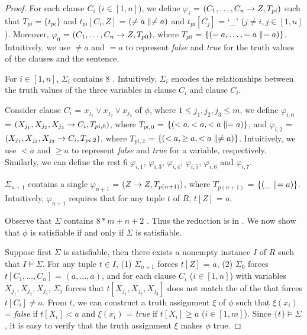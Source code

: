 {\begin{proof}
For each clause $C_i$ ($i\in[1, n]$), we define \pCFD $\varphi_i$ =
$(C_1,\ldots, C_n\rightarrow Z, T_{pi})$ such that $T_{pi} = \{t_{pi}\}$ and
$t_{pi}[C_i,Z]$ = $(\ne a \parallel \ne a)$ and $t_{pi}[C_j]$ = `\_'
($j\ne i, j\in[1, n]$). Moreover, \pCFD $\varphi_{0}$ =
$(C_1,\ldots, C_n\rightarrow Z, T_{p0})$, where $T_{p0}$ = $\{(= a, \ldots,
=a \parallel = a)\}$. Intuitively, we use $\ne a$ and $= a$ to represent
{\em false} and {\em true} for the truth values of the clauses and
the sentence.

\item For $i\in[1, n]$, $\Sigma_i$ contains $8$ \pCFDs.  Intuitively, $\Sigma_i$
encodes the relationships between the truth values of the three
variables in clause $C_i$ and clause $C_i$.

Consider clause $C_i$ = $x_{j_1} \lor \overline{x_{j_2}} \lor
x_{j_3}$ of $\phi$, where $1\le j_1, j_2, j_3 \le m$, we define
\pCFDs $\varphi_{i,0}$ = $(X_{j_1},X_{j_2},X_{j_3}\rightarrow C_i,
T_{pi,0})$, where $T_{pi,0}$ = $\{(< a, < a, <a \parallel = a)\}$, and
$\varphi_{i,2}$ = $(X_{j_1},X_{j_2},X_{j_3}\rightarrow C_i, T_{pi,2})$,
where $T_{pi,2}$ = $\{(< a, \ge a, < a \parallel \ne a)\}$. Intuitively,
we use $<a$ and $\ge a$ to represent {\em false} and {\em true} for
a variable, respectively. Similarly, we can define the rest $6$
\pCFDs $\varphi_{i,1}$, $\varphi_{i,3}$, $\varphi_{i,4}$,
$\varphi_{i,5}$, $\varphi_{i,6}$ and $\varphi_{i,7}$.

\item $\Sigma_{n + 1}$ contains a single \pCFD $\varphi_{n+1}$ =
$(Z \rightarrow Z, T_{p(n+1)})$, where $T_{p(n+1)}$ = $\{(\_ \parallel = a)\}$.
Intuitively, $\varphi_{n+1}$ requires that for any tuple $t$ of $R$,
$t[Z]$ = $a$. \ei\vspace{-1.5ex}

Observe that $\Sigma$ contains $8*m + n + 2$ \pCFDs. Thus the
reduction is in \PTIME. We now show that $\phi$ is satisfiable if
and only if $\Sigma$ is satisfiable.

Suppose first $\Sigma$ is satisfiable, then there exists a nonempty
instance $I$ of $R$ such that $I\models\Sigma$. For any tuple $t\in
I$, (1) $\Sigma_{n+1}$ forces $t[Z]$ = $a$, (2) $\Sigma_0$ forces
$t[C_1, \ldots, C_n]$ = $(a, \ldots, a)$, and for each clause $C_i$
($i\in[1, n]$) with variables $X_{j_1},X_{j_2},X_{j_3}$, $\Sigma_j$
forces that $t[X_{j_1},X_{j_2},X_{j_3}]$  does not match the \LHS of
the \pCFD that forces $t[C_i]\ne a$. From $t$, we can construct a
truth assignment $\xi$ of $\phi$ such that $\xi(x_i)$ = {\em false}
if $t[X_i]< a$ and  $\xi(x_i)$ = {\em true} if $t[X_i]\ge a$
($i\in[1, m]$). Since $\{t\}\models\Sigma$, it is easy to verify
that the truth assignment $\xi$ makes $\phi$ true.


\end{proof}}

